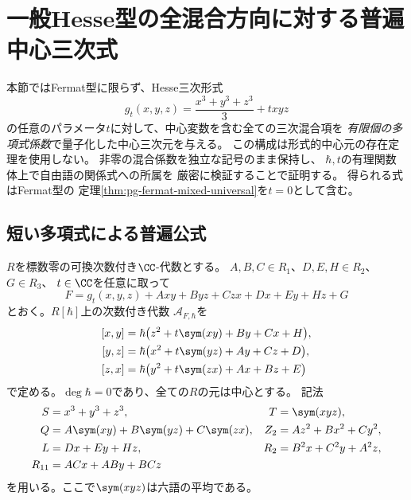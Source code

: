 \section{一般Hesse型の全混合方向に対する普遍中心三次式}
\label{sec:pg-hesse-mixed-universal}
本節ではFermat型に限らず、Hesse三次形式
\begin{equation}
 g_t(x,y,z)=\frac{x^3+y^3+z^3}{3}+txyz
\end{equation}
の任意のパラメータ$t$に対して、中心変数を含む全ての三次混合項を
\emph{有限個の多項式係数}で量子化した中心三次元を与える。
この構成は形式的中心元の存在定理を使用しない。
非零の混合係数を独立な記号のまま保持し、
$\hbar,t$の有理関数体上で自由語の関係式への所属を
厳密に検証することで証明する。
得られる式はFermat型の
定理\ref{thm:pg-fermat-mixed-universal}を$t=0$として含む。

\subsection{短い多項式による普遍公式}
$R$を標数零の可換次数付き$\CC$-代数とする。
$A,B,C\in R_1$、$D,E,H\in R_2$、$G\in R_3$、
$t\in\CC$を任意に取って
\begin{equation}
 F=g_t(x,y,z)+Axy+Byz+Czx+Dx+Ey+Hz+G
 \label{eq:pg-hm-F}
\end{equation}
とおく。$R[\hbar]$上の次数付き代数
$\mathcal A_{F,\hbar}$を
\begin{equation}
\begin{aligned}
 [x,y]&=\hbar\bigl(z^2+t\sym(xy)+By+Cx+H\bigr),\\
 [y,z]&=\hbar\bigl(x^2+t\sym(yz)+Ay+Cz+D\bigr),\\
 [z,x]&=\hbar\bigl(y^2+t\sym(zx)+Ax+Bz+E\bigr)
\end{aligned}
\label{eq:pg-hm-rel}
\end{equation}
で定める。$\deg\hbar=0$であり、全ての$R$の元は中心とする。
記法
\begin{equation}
\begin{aligned}
 S={}&x^3+y^3+z^3,&
 T={}&\sym(xyz),\\
 Q={}&A\sym(xy)+B\sym(yz)+C\sym(zx),&
 Z_2={}&Az^2+Bx^2+Cy^2,\\
 L={}&Dx+Ey+Hz,&
 R_2={}&B^2x+C^2y+A^2z,\\
 R_{11}={}&ACx+ABy+BCz
\end{aligned}
\end{equation}
を用いる。ここで$\sym(xyz)$は六語の平均である。

